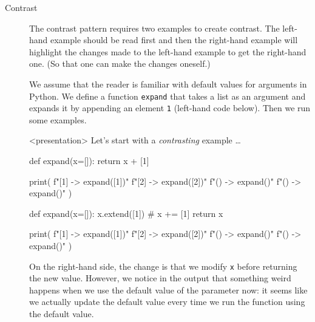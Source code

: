 \begin{description}
  \item[Contrast] The contrast pattern requires two examples to create 
    contrast.
    The left-hand example should be read first and then the right-hand 
    example will highlight the changes made to the left-hand example to get 
    the right-hand one.
    (So that one can make the changes oneself.)

    We assume that the reader is familiar with default values for arguments in 
    Python.
    We define a function \texttt{expand} that takes a list as an 
    argument and expands it by appending an element \texttt{1} 
    (left-hand code below).
    Then we run some examples.

    \begin{frame}<presentation>
      Let's start with a \emph{contrasting} example \dots
    \end{frame}

    \begin{frame}[fragile]
    \begin{minipage}[t]{0.45\columnwidth}
      \begin{pyblock}[default1]
def expand(x=[]):
  return x + [1]


print(
  f"[1] -> {expand([1])}\n"
  f"[2] -> {expand([2])}\n"
  f"()  -> {expand()}\n"
  f"()  -> {expand()}\n"
)
      \end{pyblock}
      \begin{block}{}\printpythontex[verbatim]\end{block}
    \end{minipage}
    \hfill
    \begin{minipage}[t]{0.45\columnwidth}
      \begin{pyblock}[default2][highlightlines={2-3}]
def expand(x=[]):
  x.extend([1]) # x += [1]
  return x

print(
  f"[1] -> {expand([1])}\n"
  f"[2] -> {expand([2])}\n"
  f"()  -> {expand()}\n"
  f"()  -> {expand()}\n"
)
      \end{pyblock}
      \begin{block}{}\printpythontex[verbatim][highlightlines={4}]\end{block}
    \end{minipage}
    \end{frame}

    On the right-hand side, the change is that we modify \texttt{x} 
    before returning the new value.
    However, we notice in the output that something weird happens when we use 
    the default value of the parameter now:
    it seems like we actually update the default value every time we run the 
    function using the default value.


\end{description}
